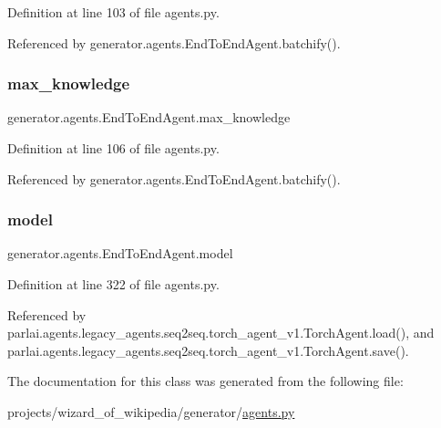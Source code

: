 Definition at line 103 of file agents.\+py.



Referenced by generator.\+agents.\+End\+To\+End\+Agent.\+batchify().

\mbox{\label{classgenerator_1_1agents_1_1EndToEndAgent_aa93b8d6bb5abf0e840e51aaef52f1256}} 
\subsubsection{\texorpdfstring{max\+\_\+knowledge}{max\_knowledge}}
{\footnotesize\ttfamily generator.\+agents.\+End\+To\+End\+Agent.\+max\+\_\+knowledge}



Definition at line 106 of file agents.\+py.



Referenced by generator.\+agents.\+End\+To\+End\+Agent.\+batchify().

\mbox{\label{classgenerator_1_1agents_1_1EndToEndAgent_aa5a6b4060a634d775055e2a1f830f07c}} 
\subsubsection{\texorpdfstring{model}{model}}
{\footnotesize\ttfamily generator.\+agents.\+End\+To\+End\+Agent.\+model}



Definition at line 322 of file agents.\+py.



Referenced by parlai.\+agents.\+legacy\+\_\+agents.\+seq2seq.\+torch\+\_\+agent\+\_\+v1.\+Torch\+Agent.\+load(), and parlai.\+agents.\+legacy\+\_\+agents.\+seq2seq.\+torch\+\_\+agent\+\_\+v1.\+Torch\+Agent.\+save().



The documentation for this class was generated from the following file\+:\begin{DoxyCompactItemize}
\item 
projects/wizard\+\_\+of\+\_\+wikipedia/generator/\hyperlink{projects_2wizard__of__wikipedia_2generator_2agents_8py}{agents.\+py}\end{DoxyCompactItemize}
